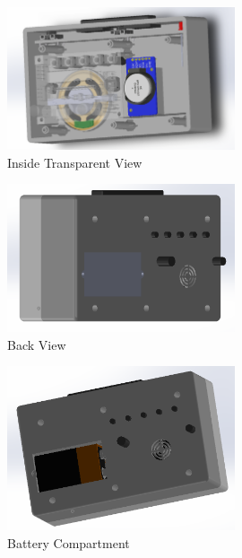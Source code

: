 \documentclass[12pt,twocolumn]{article}
\begin{document}
\begin{center}
    \begin{figure}[!h]
        \centering\includegraphics[width=0.60\textwidth]{backb}
        \caption*{Inside Transparent View}
    \end{figure}
\end{center}

\begin{center}
    \begin{figure}[!h]
        \centering\includegraphics[width=0.60\textwidth]{backe}
        \caption*{Back View}
    \end{figure}
\end{center}

\begin{center}
    \begin{figure}[!h]
        \centering\includegraphics[width=0.60\textwidth]{battery}
        \caption*{Battery Compartment}
    \end{figure}
\end{center}
\end{document}
